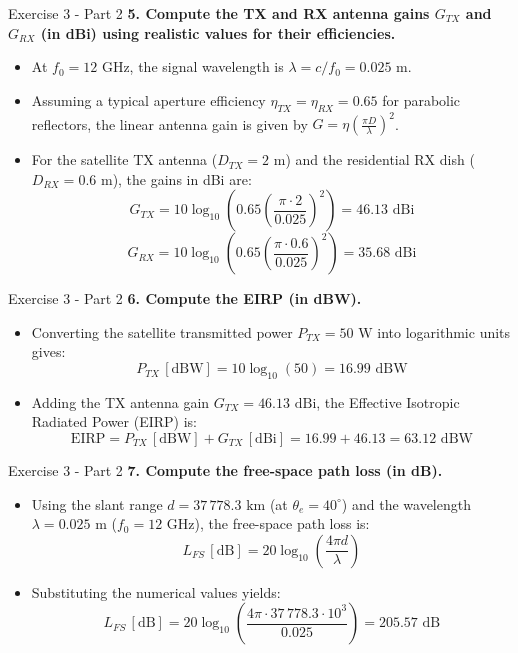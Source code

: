\documentclass[10pt, aspectratio=169]{beamer}
\newcommand{\question}[1]{{\color{QuestionRed}\textbf{#1}}}
\begin{document}
	\begin{frame}{Exercise 3 - Part 2}
		\question{5. Compute the TX and RX antenna gains $G_{TX}$ and $G_{RX}$ (in dBi) using realistic values for their efficiencies.}
		
		\vspace{0.1cm}
		\begin{itemize}
			\item At $f_0 = 12\text{ GHz}$, the signal wavelength is $\lambda = c / f_0 = 0.025\text{ m}$.
			\item Assuming a typical aperture efficiency $\eta_{TX} = \eta_{RX} = 0.65$ for parabolic reflectors, the linear antenna gain is given by $G = \eta \left(\frac{\pi D}{\lambda}\right)^2$.
			\item For the satellite TX antenna ($D_{TX} = 2\text{ m}$) and the residential RX dish ($D_{RX} = 0.6\text{ m}$), the gains in dBi are:
			\[
			G_{TX} = 10\log_{10}\!\left(0.65 \left(\frac{\pi \cdot 2}{0.025}\right)^2\right) = 46.13\text{ dBi}
			\]
			\[
			G_{RX} = 10\log_{10}\!\left(0.65 \left(\frac{\pi \cdot 0.6}{0.025}\right)^2\right) = 35.68\text{ dBi}
			\]
		\end{itemize}
		
	\end{frame}
	
	\begin{frame}{Exercise 3 - Part 2}
		\question{6. Compute the EIRP (in dBW).}
		
		\vspace{0.1cm}
		\begin{itemize}
			\item Converting the satellite transmitted power $P_{TX} = 50\text{ W}$ into logarithmic units gives:
			\[
			P_{TX}\,[\text{dBW}] = 10\log_{10}(50) = 16.99\text{ dBW}
			\]
			\item Adding the TX antenna gain $G_{TX} = 46.13\text{ dBi}$, the Effective Isotropic Radiated Power (EIRP) is:
			\[
			\text{EIRP} = P_{TX}\,[\text{dBW}] + G_{TX}\,[\text{dBi}] = 16.99 + 46.13 = 63.12\text{ dBW}
			\]
		\end{itemize}
		
	\end{frame}
	
	\begin{frame}{Exercise 3 - Part 2}
		\question{7. Compute the free-space path loss (in dB).}
		
		\vspace{0.1cm}
		\begin{itemize}
			\item Using the slant range $d = 37\,778.3\text{ km}$ (at $\theta_e = 40^\circ$) and the wavelength $\lambda = 0.025\text{ m}$ ($f_0 = 12\text{ GHz}$), the free-space path loss is:
			\[
			L_{FS}\,[\text{dB}] = 20\log_{10}\!\left(\frac{4\pi d}{\lambda}\right)
			\]
			\item Substituting the numerical values yields:
			\[
			L_{FS}\,[\text{dB}] = 20\log_{10}\!\left(\frac{4\pi \cdot 37\,778.3 \cdot 10^3}{0.025}\right) = 205.57\text{ dB}
			\]
		\end{itemize}
		
	\end{frame}
	
\end{document}
